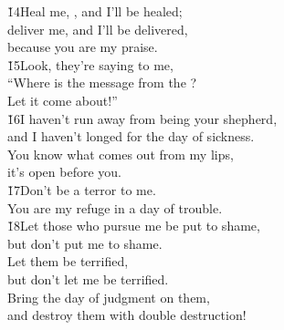 \begin{poetry}
\poeml \v{14}Heal me, , and I'll be healed; \\
\poemll    deliver me, and I'll be delivered, \\
\poemlll       because you are my praise. \\
\poeml \v{15}Look, they're saying to me, \\
\poemll    ``Where is the message from the ? \\
\poemlll       Let it come about!'' \\
\poeml \v{16}I haven't run away from being your shepherd, \\
\poemll    and I haven't longed for the day of sickness. \\
\poeml You know what comes out from my lips, \\
\poemll    it's open before you. \\
\poeml \v{17}Don't be a terror to me. \\
\poemll    You are my refuge in a day of trouble. \\
\poeml \v{18}Let those who pursue me be put to shame, \\
\poemll    but don't put me to shame. \\
\poeml Let them be terrified, \\
\poemll    but don't let me be terrified. \\
\poeml Bring the day of judgment on them, \\
\poemll    and destroy them with double destruction!
\end{poetry}

